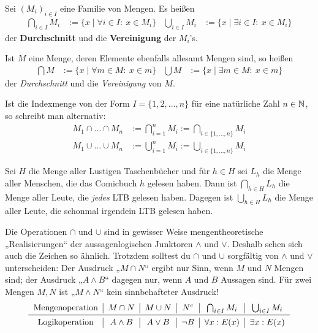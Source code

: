 \begin{defin} \label{def:mehrfachcapcup}
    Sei $(M_i)_{i\in I}$ eine Familie von Mengen. Es heißen
    \begin{align*}
        \bigcap_{i\in I} M_i &:= \{x \mid \forall i\in I:\ x\in M_i\} & \bigcup_{i\in I}M_i &:= \{x \mid \exists i\in I:\ x\in M_i\}
    \end{align*}
    der \textbf{Durchschnitt} und die \textbf{Vereinigung} der $M_i$'s.
    
    Ist $M$ eine Menge, deren Elemente ebenfalls allesamt Mengen sind, so heißen
    \begin{align*}
        \bigcap M & := \{ x \mid \forall m\in M:\ x\in m \} & \bigcup M & := \{x\mid \exists m\in M:\ x\in m \}
    \end{align*}
    der \emph{Durchschnitt} und die \emph{Vereinigung} von $M$.
\end{defin}


\begin{nota} \label{alternativmehrfachcapcup}
    Ist die Indexmenge von der Form $I=\{1,2,\dots,n\}$ für eine natürliche Zahl $n\in \mathbb N$, so schreibt man alternativ:
    \begin{align*}
        M_1\cap \ldots\cap M_n & := \bigcap_{i=1}^n M_i := \bigcap_{i\in \{1,\dots , n\}} M_i\\
        M_1\cup \ldots\cup M_n & := \bigcup_{i=1}^n M_i := \bigcup_{i\in \{1,\dots , n\}} M_i
    \end{align*}
\end{nota}


\begin{bsp}
    Sei $H$ die Menge aller Lustigen Taschenbücher und für $h\in H$ sei $L_h$ die Menge aller Menschen, die das Comicbuch $h$ gelesen haben. Dann ist $\bigcap_{h\in H} L_h$ die Menge aller Leute, die \emph{jedes} LTB gelesen haben. Dagegen ist $\bigcup_{h\in H} L_h$ die Menge aller Leute, die schonmal irgendein LTB gelesen haben.
\end{bsp}


\begin{bem}
    Die Operationen $\cap$ und $\cup$ sind in gewisser Weise mengentheoretische „Realisierungen“ der aussagenlogischen Junktoren $\land$ und $\lor$. Deshalb sehen sich auch die Zeichen so ähnlich. Trotzdem solltest du $\cap$ und $\cup$ sorgfältig von $\land$ und $\lor$ unterscheiden: Der Ausdruck „$M\cap N$“ ergibt nur Sinn, wenn $M$ und $N$ Mengen sind; der Ausdruck „$A\wedge B$“ dagegen nur, wenn $A$ und $B$ Aussagen sind. Für zwei Mengen $M,N$ ist „$M\land N$“ kein sinnbehafteter Ausdruck!
    \[\begin{tabular}{c|c|c|c|c|c}
        Mengenoperation & $M\cap N$ & $M\cup N$ & $N^c$ & $\bigcap_{i\in I} M_i$ & $\bigcup_{i\in I} M_i$ \\ \midrule
        Logikoperation & $A\land B$ & $A \lor B$ & $\neg B$ & $\forall x: E(x)$ & $\exists x: E(x)$
    \end{tabular}\]
\end{bem}



